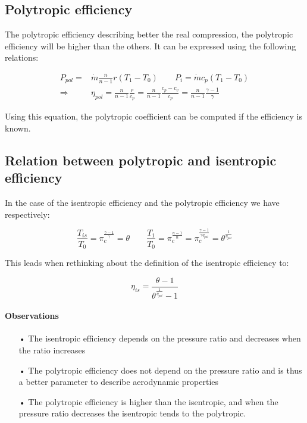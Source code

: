 \subsection{Polytropic efficiency}
The polytropic efficiency describing better the real compression, the polytropic efficiency will be higher than the others. It can be expressed using the following relations: 

\begin{equation}
\begin{aligned}
P_{pol} = &\dot{m} \frac{n}{n-1}r(T_1 - T_0) \qquad P_i = \dot{m }c_p (T_1 - T_0)\\
\Rightarrow &\eta _{pol} = \frac{n}{n-1}\frac{r}{c_p} = \frac{n}{n -1} \frac{c_p - c_v}{c_p} = \frac{n}{n-1}\frac{\gamma -1}{\gamma}
\end{aligned}
\end{equation}

Using this equation, the polytropic coefficient can be computed if the efficiency is known.

\subsection{Relation between polytropic and isentropic efficiency}
In the case of the isentropic efficiency and the polytropic efficiency we have respectively: 

\begin{equation}
\frac{T_{is}}{T_0} = \pi _c ^{\frac{\gamma-1}{\gamma}} = \theta \qquad \frac{T_{1}}{T_0} = \pi _c ^{\frac{n-1}{n}} = \pi _c ^{\frac{\gamma - 1}{\gamma \eta_{pol}}} =  \theta ^{\frac{1}{\eta_{pol}}}
\end{equation}

This leads when rethinking about the definition of the isentropic efficiency to: 

\begin{equation}
\eta _{is} = \frac{\theta - 1}{\theta ^{\frac{1}{\eta _{pol}}}-1}
\end{equation}

\paragraph{Observations} 

\begin{itemize}
\item[•] The isentropic efficiency depends on the pressure ratio and decreases when the ratio increases
\item[•] The polytropic efficiency does not depend on the pressure ratio and is thus a better parameter to describe aerodynamic properties
\item[•] The polytropic efficiency is higher than the isentropic, and when the pressure ratio decreases the isentropic tends to the polytropic.
\end{itemize}

